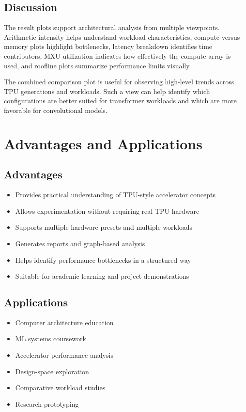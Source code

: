 \documentclass[12pt,a4paper]{article}
\begin{document}
	\subsection{Discussion}
	The result plots support architectural analysis from multiple viewpoints. Arithmetic intensity helps understand workload characteristics, compute-versus-memory plots highlight bottlenecks, latency breakdown identifies time contributors, MXU utilization indicates how effectively the compute array is used, and roofline plots summarize performance limits visually.
	
	The combined comparison plot is useful for observing high-level trends across TPU generations and workloads. Such a view can help identify which configurations are better suited for transformer workloads and which are more favorable for convolutional models.
	
	\section{Advantages and Applications}
	
	\subsection{Advantages}
	\begin{itemize}[itemsep=2pt, topsep=4pt]
		\item Provides practical understanding of TPU-style accelerator concepts
		\item Allows experimentation without requiring real TPU hardware
		\item Supports multiple hardware presets and multiple workloads
		\item Generates reports and graph-based analysis
		\item Helps identify performance bottlenecks in a structured way
		\item Suitable for academic learning and project demonstrations
	\end{itemize}
	
	\subsection{Applications}
	\begin{itemize}[itemsep=2pt, topsep=4pt]
		\item Computer architecture education
		\item ML systems coursework
		\item Accelerator performance analysis
		\item Design-space exploration
		\item Comparative workload studies
		\item Research prototyping
	\end{itemize}
	
\end{document}
